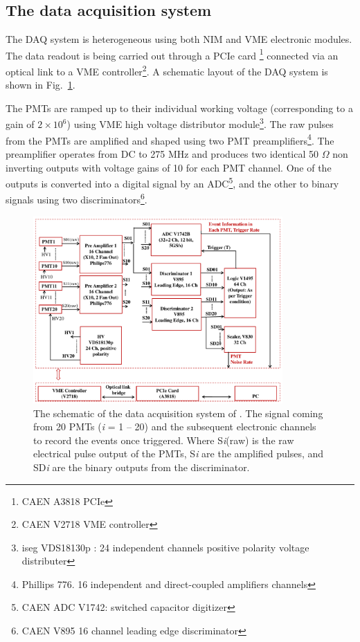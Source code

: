 \subsection{The data acquisition system }
\label{sec:DAQ}



The DAQ system is heterogeneous using both 
NIM and VME electronic modules. The data readout is being carried out through a PCIe card \footnote{CAEN A3818 PCIe}  connected via an optical link to a VME controller\footnote{CAEN V2718 VME controller}. A schematic layout of the DAQ system is shown in Fig.~{\ref{Fig:DAQscheme}}. 

The PMTs are ramped up to their individual working voltage (corresponding to a gain of $2\times10^6$) using VME high voltage distributor module\footnote{iseg VDS18130p : 
24 independent channels positive polarity voltage distributer}. The raw pulses from the PMTs are amplified and shaped using 
two PMT preamplifiers\footnote{Phillips 776. 16 independent and direct-coupled amplifiers channels}. The preamplifier operates 
from DC to 275 MHz and produces two identical 50 $\Omega$ non inverting outputs with voltage gains of 10 for each PMT channel. One 
of the outputs is converted into a digital signal by an ADC\footnote{CAEN ADC V1742: switched capacitor digitizer}, and the other to 
binary signals using two discriminators\footnote{CAEN V895 16 channel leading edge discriminator}.

\begin{figure}[h]
   \centering
   \includegraphics[width=0.85\textwidth]{DAQscheme.pdf}
   \caption{The schematic of the data acquisition system of \direxeno. The 			signal coming from 20 PMTs ({\it i} = 1 -- 20) and the subsequent electronic channels to record the events once triggered. Where S{\it i}(raw) is the raw electrical pulse output of the PMTs, S{\it i} are the amplified pulses, and SD{\it i} are the binary outputs from the discriminator.
}
   \label{Fig:DAQscheme}
\end{figure}



